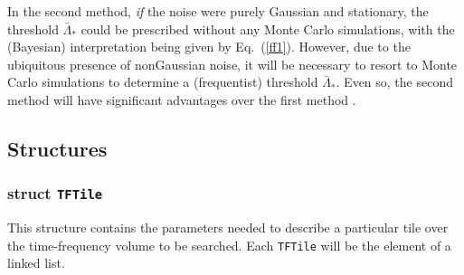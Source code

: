 In the second method, {\it if} the noise were purely Gaussian and
stationary, the threshold ${\bar \Lambda}_*$ could be prescribed 
without any Monte Carlo simulations, with the (Bayesian)
interpretation being given by Eq.\ (\ref{ff1}).  However, due to the
ubiquitous presence of nonGaussian noise, it will be necessary to
resort to Monte Carlo simulations to determine a (frequentist)
threshold ${\bar \Lambda}_*$.  Even so, the second method will have
significant advantages over the first method \cite{abcf:2000}. 
 

\subsection*{Structures}

\subsubsection*{struct \texttt{TFTile}}

\noindent This structure contains the parameters needed to describe a
particular tile over the time-frequency volume to be searched.  Each
\verb+TFTile+ will be the element of a linked list. 

